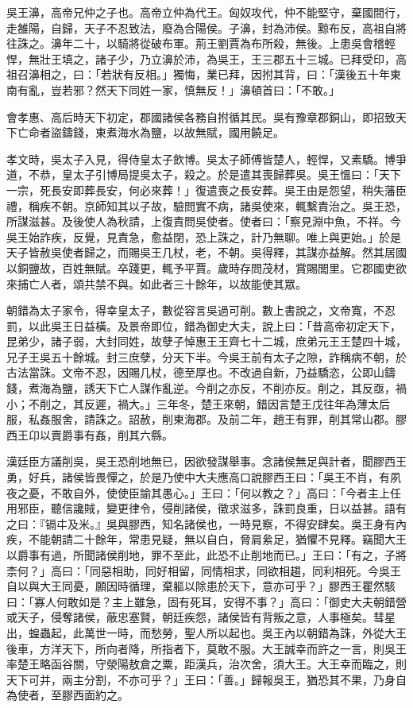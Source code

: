 \begin{pinyinscope}
吳王濞，高帝兄仲之子也。高帝立仲為代王。匈奴攻代，仲不能堅守，棄國間行，走雒陽，自歸，天子不忍致法，廢為合陽侯。子濞，封為沛侯。黥布反，高祖自將往誅之。濞年二十，以騎將從破布軍。荊王劉賈為布所殺，無後。上患吳會稽輕悍，無壯王填之，諸子少，乃立濞於沛，為吳王，王三郡五十三城。已拜受印，高祖召濞相之，曰：「若狀有反相。」獨悔，業已拜，因拊其背，曰：「漢後五十年東南有亂，豈若邪？然天下同姓一家，慎無反！」濞頓首曰：「不敢。」

會孝惠、高后時天下初定，郡國諸侯各務自拊循其民。吳有豫章郡銅山，即招致天下亡命者盜鑄錢，東煮海水為鹽，以故無賦，國用饒足。

孝文時，吳太子入見，得侍皇太子飲博。吳太子師傅皆楚人，輕悍，又素驕。博爭道，不恭，皇太子引博局提吳太子，殺之。於是遣其喪歸葬吳。吳王慍曰：「天下一宗，死長安即葬長安，何必來葬！」復遣喪之長安葬。吳王由是怨望，稍失藩臣禮，稱疾不朝。京師知其以子故，驗問實不病，諸吳使來，輒繫責治之。吳王恐，所謀滋甚。及後使人為秋請，上復責問吳使者。使者曰：「察見淵中魚，不祥。今吳王始詐疾，反覺，見責急，愈益閉，恐上誅之，計乃無聊。唯上與更始。」於是天子皆赦吳使者歸之，而賜吳王几杖，老，不朝。吳得釋，其謀亦益解。然其居國以銅鹽故，百姓無賦。卒踐更，輒予平賈。歲時存問茂材，賞賜閭里。它郡國吏欲來捕亡人者，頌共禁不與。如此者三十餘年，以故能使其眾。

朝錯為太子家令，得幸皇太子，數從容言吳過可削。數上書說之，文帝寬，不忍罰，以此吳王日益橫。及景帝即位，錯為御史大夫，說上曰：「昔高帝初定天下，昆弟少，諸子弱，大封同姓，故孽子悼惠王王齊七十二城，庶弟元王王楚四十城，兄子王吳五十餘城。封三庶孽，分天下半。今吳王前有太子之隙，詐稱病不朝，於古法當誅。文帝不忍，因賜几杖，德至厚也。不改過自新，乃益驕恣，公即山鑄錢，煮海為鹽，誘天下亡人謀作亂逆。今削之亦反，不削亦反。削之，其反亟，禍小；不削之，其反遲，禍大。」三年冬，楚王來朝，錯因言楚王戊往年為薄太后服，私姦服舍，請誅之。詔赦，削東海郡。及前二年，趙王有罪，削其常山郡。膠西王卬以賣爵事有姦，削其六縣。

漢廷臣方議削吳，吳王恐削地無已，因欲發謀舉事。念諸侯無足與計者，聞膠西王勇，好兵，諸侯皆畏憚之，於是乃使中大夫應高口說膠西王曰：「吳王不肖，有夙夜之憂，不敢自外，使使臣諭其愚心。」王曰：「何以教之？」高曰：「今者主上任用邪臣，聽信讒賊，變更律令，侵削諸侯，徵求滋多，誅罰良重，日以益甚。語有之曰：『镉㐄及米。』吳與膠西，知名諸侯也，一時見察，不得安肆矣。吳王身有內疾，不能朝請二十餘年，常患見疑，無以自白，脅肩絫足，猶懼不見釋。竊聞大王以爵事有過，所聞諸侯削地，罪不至此，此恐不止削地而已。」王曰：「有之，子將柰何？」高曰：「同惡相助，同好相留，同情相求，同欲相趨，同利相死。今吳王自以與大王同憂，願因時循理，棄軀以除患於天下，意亦可乎？」膠西王瞿然駭曰：「寡人何敢如是？主上雖急，固有死耳，安得不事？」高曰：「御史大夫朝錯營或天子，侵奪諸侯，蔽忠塞賢，朝廷疾怨，諸侯皆有背叛之意，人事極矣。彗星出，蝗蟲起，此萬世一時，而愁勞，聖人所以起也。吳王內以朝錯為誅，外從大王後車，方洋天下，所向者降，所指者下，莫敢不服。大王誠幸而許之一言，則吳王率楚王略函谷關，守滎陽敖倉之粟，距漢兵，治次舍，須大王。大王幸而臨之，則天下可并，兩主分割，不亦可乎？」王曰：「善。」歸報吳王，猶恐其不果，乃身自為使者，至膠西面約之。


\end{pinyinscope}
